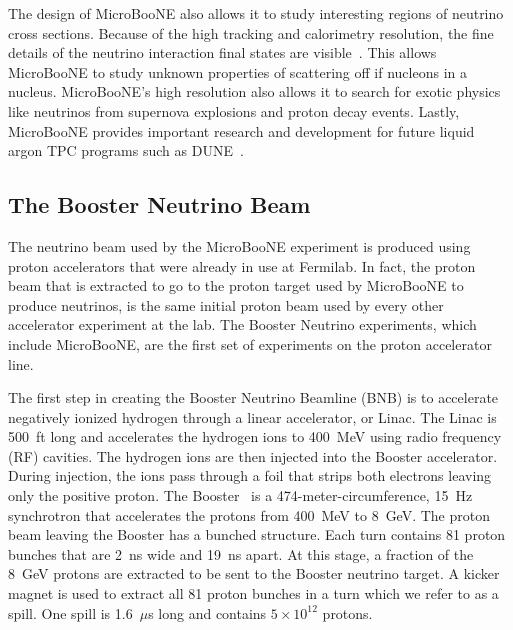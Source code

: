   The design of MicroBooNE also allows it to study interesting regions of
  neutrino cross sections. Because of the high tracking and calorimetry
  resolution, the fine details of the neutrino interaction final states are
  visible~\cite{Adams:2018fud}. This allows MicroBooNE to study unknown
  properties of scattering off if nucleons in a nucleus.  MicroBooNE's high
  resolution also allows it to search for exotic physics like neutrinos from
  supernova explosions and proton decay events. Lastly, MicroBooNE provides
  important research and development for future liquid argon TPC programs such
  as DUNE~\cite{Diwan:2016gmz}.

\subsection{The Booster Neutrino Beam}\label{sec:beam}
  The neutrino beam used by the MicroBooNE experiment is produced using proton
  accelerators that were already in use at Fermilab. In fact, the proton beam
  that is extracted to go to the proton target used by MicroBooNE to produce
  neutrinos, is the same initial proton beam used by every other accelerator
  experiment at the lab. The Booster Neutrino experiments, which include
  MicroBooNE, are the first set of experiments on the proton accelerator line.

  The first step in creating the Booster Neutrino Beamline (BNB) is to
  accelerate negatively ionized hydrogen through a linear accelerator, or
  Linac. The Linac is 500~ft long and accelerates the hydrogen ions to
  400~MeV using radio frequency (RF) cavities. The hydrogen ions are then
  injected into the Booster accelerator. During injection, the ions pass
  through a foil that strips both electrons leaving only the positive proton.
  The Booster~\cite{AguilarArevalo:2008yp} is a 474-meter-circumference, 15~Hz
  synchrotron that accelerates the protons from 400~MeV to 8~GeV. The proton
  beam leaving the Booster has a bunched structure. Each turn contains 81
  proton bunches that are 2~ns wide and 19~ns apart. At this stage, a
  fraction of the 8~GeV protons are extracted to be sent to the Booster
  neutrino target. A kicker magnet is used to extract all 81 proton bunches
  in a turn which we refer to as a spill. One spill is 1.6~$\mu$s long and
  contains $5\times 10^{12}$ protons.

